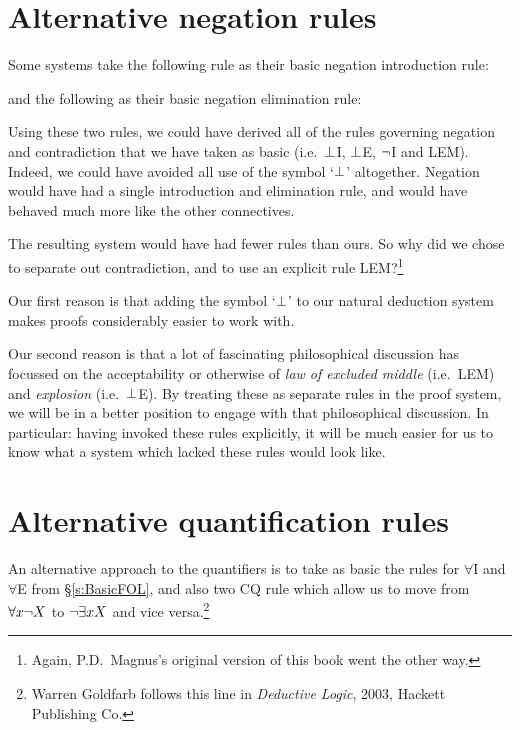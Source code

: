 \section{Alternative negation rules}
Some systems take the following rule as their basic negation introduction rule:
\begin{pf}
	\open
	\close
	\have[\ ]{}{\enot\metaX}
\end{pf}
and the following as their basic negation elimination rule:
\begin{pf}
	\open
	\close
\end{pf}
Using these two rules, we could have derived all of the rules governing negation and contradiction that we have taken as basic (i.e.\ $\bot$I, $\bot$E, $\neg$I and LEM). Indeed, we could have avoided all use of the symbol `$\bot$' altogether. Negation would have had a single introduction and elimination rule, and would have behaved much more like the other connectives.

The resulting system would have had fewer rules than ours. So why did we chose to separate out contradiction, and to use an explicit rule LEM?\footnote{Again, P.D.\ Magnus's original version of this book went the other way.}

Our first reason is that adding the symbol `$\bot$' to our natural deduction system makes proofs considerably easier to work with.

Our second reason is that a lot of fascinating philosophical discussion has focussed on the acceptability or otherwise of \emph{law of excluded middle} (i.e.\ LEM) and \emph{explosion} (i.e.\ $\bot$E). By treating these as separate rules in the proof system, we will be  in a better position to engage with that philosophical discussion. In particular: having invoked these rules explicitly, it will be much easier for us to know what a system which lacked these rules would look like.



\section{Alternative quantification rules}
An alternative approach to the quantifiers is to take as basic the rules for $\forall$I and $\forall$E from \S\ref{s:BasicFOL}, and also two CQ rule which allow us to move from $\forall x \neg X$ to $\neg \exists x X$ and vice versa.\footnote{Warren Goldfarb follows this line in \emph{Deductive Logic}, 2003, Hackett Publishing Co.}  

